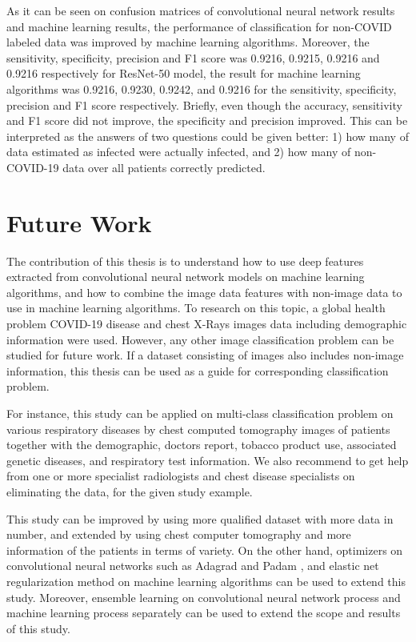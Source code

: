 As it can be seen on confusion matrices of convolutional neural network results and machine learning results, the performance of classification for non-COVID labeled data was improved by machine learning algorithms. Moreover, the sensitivity, specificity, precision and F1 score was 0.9216, 0.9215, 0.9216 and 0.9216 respectively for ResNet-50 model, the result for machine learning algorithms was 0.9216, 0.9230, 0.9242, and 0.9216 for the sensitivity, specificity, precision and F1 score respectively. Briefly, even though the accuracy, sensitivity and F1 score did not improve, the specificity and precision improved. This can be interpreted as the answers of two questions could be given better: 1) how many of data estimated as infected were actually infected, and 2) how many of non-COVID-19 data over all patients correctly predicted.

\section{Future Work}

The contribution of this thesis is to understand how to use deep features extracted from convolutional neural network models on machine learning algorithms, and how to combine the image data features with non-image data to use in machine learning algorithms. To research on this topic, a global health problem COVID-19 disease and chest X-Rays images data including demographic information were used. However, any other image classification problem can be studied for future work. If a dataset consisting of images also includes non-image information, this thesis can be used as a guide for corresponding classification problem.

For instance, this study can be applied on multi-class classification problem on various respiratory diseases by chest computed tomography images of patients together with the demographic, doctors report, tobacco product use, associated genetic diseases, and respiratory test information. We also recommend to get help from one or more specialist radiologists and chest disease specialists on eliminating the data, for the given study example.

This study can be improved by using more qualified dataset with more data in number, and extended by using chest computer tomography and more information of the patients in terms of variety. On the other hand, optimizers on convolutional neural networks such as Adagrad \cite{adagrad} and Padam \cite{padam}, and elastic net regularization method \cite{elasticnet_paper} on machine learning algorithms can be used to extend this study. Moreover, ensemble learning \cite{ensemble_learning} on convolutional neural network process and machine learning process separately can be used to extend the scope and results of this study. 


